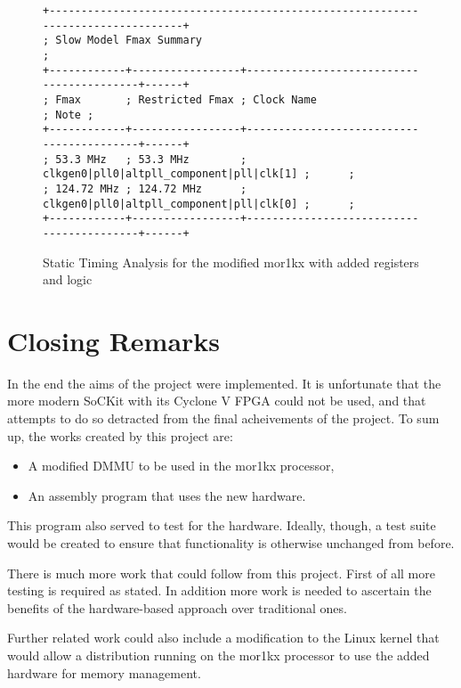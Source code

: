 \begin{figure}[p]
  \centering
  \footnotesize
  \begin{verbatim}
+--------------------------------------------------------------------------------+
; Slow Model Fmax Summary                                                        ;
+------------+-----------------+------------------------------------------+------+
; Fmax       ; Restricted Fmax ; Clock Name                               ; Note ;
+------------+-----------------+------------------------------------------+------+
; 53.3 MHz   ; 53.3 MHz        ; clkgen0|pll0|altpll_component|pll|clk[1] ;      ;
; 124.72 MHz ; 124.72 MHz      ; clkgen0|pll0|altpll_component|pll|clk[0] ;      ;
+------------+-----------------+------------------------------------------+------+
  \end{verbatim}
  \caption{Static Timing Analysis for the modified mor1kx with added registers and logic}
  \label{fig:sta_after}
\end{figure}

\section{Closing Remarks}
In the end the aims of the project were implemented. It is unfortunate that the more modern SoCKit with its Cyclone V FPGA could not be used, and that attempts to do so detracted from the final acheivements of the project. To sum up, the works created by this project are:
\begin{itemize}
\item A modified DMMU to be used in the mor1kx processor,
\item An assembly program that uses the new hardware.
\end{itemize}

This program also served to test for the hardware. Ideally, though, a test suite would be created to ensure that functionality is otherwise unchanged from before.

There is much more work that could follow from this project. First of all more testing is required as stated. In addition more work is needed to ascertain the benefits of the hardware-based approach over traditional ones.

Further related work could also include a modification to the Linux kernel that would allow a distribution running on the mor1kx processor to use the added hardware for memory management.